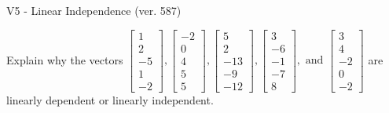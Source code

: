 \begin{exercise}
  \begin{exerciseTitle}V5 - Linear Independence (ver. 587)\end{exerciseTitle}
  \begin{exerciseStatement}
    Explain why the vectors \(\left[\begin{array}{r}
1 \\
2 \\
-5 \\
1 \\
-2
\end{array}\right] , \left[\begin{array}{r}
-2 \\
0 \\
4 \\
5 \\
5
\end{array}\right] , \left[\begin{array}{r}
5 \\
2 \\
-13 \\
-9 \\
-12
\end{array}\right] , \left[\begin{array}{r}
3 \\
-6 \\
-1 \\
-7 \\
8
\end{array}\right] , \text{ and } \left[\begin{array}{r}
3 \\
4 \\
-2 \\
0 \\
-2
\end{array}\right]\) are linearly dependent or linearly independent.	



\end{exerciseStatement}
\end{exercise}
